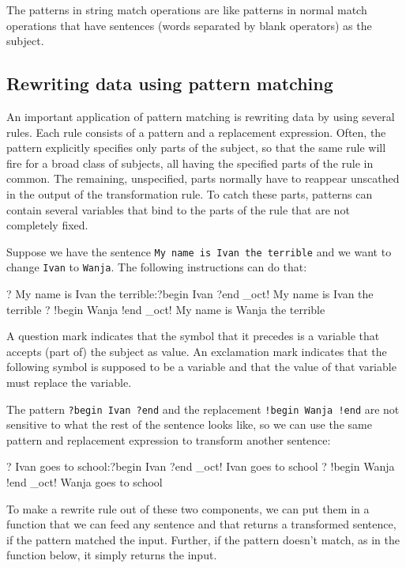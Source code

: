 \documentclass[12pt]{article}
\begin{document}
The patterns in string match operations are like patterns in
normal match operations that have sentences (words separated by blank
operators) as the subject.

\subsection{Rewriting data using pattern matching}

An important application of pattern matching is rewriting data by
using several rules. Each rule consists of a pattern and a
replacement expression. Often, the pattern explicitly specifies only
parts of the subject, so that the same rule will fire for a broad
class of subjects, all having the specified parts of the rule in
common. The remaining, unspecified, parts normally have to reappear
unscathed in the output of the transformation rule. To catch these
parts, patterns can contain several variables that bind to the
parts of the rule that are not completely fixed.

Suppose we have the sentence \texttt{My name is Ivan the terrible} and
we want to change \texttt{Ivan} to \texttt{Wanja}. The following
instructions can do that:
\begin{ex}
{?} My name is Ivan the terrible:?begin Ivan ?end
_oct{!} My name is Ivan the terrible
{?} !begin Wanja !end
_oct{!} My name is Wanja the terrible
\end{ex}

A question mark indicates that the symbol that it precedes is a
variable that accepts (part of) the subject as value. An exclamation
mark indicates that the following symbol is supposed to be a variable
and that the value of that variable must replace the variable.

The pattern \verb|?begin Ivan ?end| and the replacement
\verb|!begin Wanja !end| are not sensitive to what the rest of the
sentence looks like, so we can use the same pattern and replacement
expression to transform another sentence:
\begin{ex}
{?} Ivan goes to school:?begin Ivan ?end
_oct{!} Ivan goes to school
{?} !begin Wanja !end
_oct{!} Wanja goes to school
\end{ex}

To make a rewrite rule out of these two components, we can put them in
a function that we can feed any sentence and that returns a
transformed sentence, if the pattern matched the input. 
Further, if the pattern doesn't match, as in the
function below, it simply returns the input.
\end{document}
